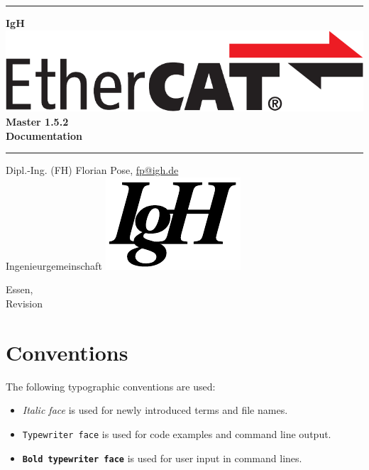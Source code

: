 \documentclass[a4paper,12pt,BCOR6mm,bibtotoc,idxtotoc]{scrbook}
\makeatletter
\renewcommand*{\lstlistoflistings}{%
  \begingroup
    \if@twocolumn
      \@restonecoltrue\onecolumn
    \else
      \@restonecolfalse
    \fi
    \lol@heading
    \setlength{\parskip}{\z@}%
    \setlength{\parindent}{\z@}%
    \setlength{\parfillskip}{\z@ \@plus 1fil}%
    \@starttoc{lol}%
    \if@restonecol\twocolumn\fi
  \endgroup
}
\newcommand{\IgH}{\raisebox{-0.7667ex}
  {\includegraphics[height=2.2ex]{images/ighsign}}}
\newcommand{\masterversion}{1.5.2}
\makeatother
\begin{document}
\pagestyle{empty}

\begin{titlepage}
  \begin{center}
    \rule{\textwidth}{1.5mm}

    {\Huge\sf\textbf{IgH \includegraphics[height=2.4ex]{images/ethercat}
      Master \masterversion}\\[1ex]
      \textbf{Documentation}}

    \vspace{1ex}
    \rule{\textwidth}{1.5mm}

    \vspace{\fill} {\Large Dipl.-Ing. (FH) Florian Pose,
    \url{fp@igh.de}\\[1ex] Ingenieurgemeinschaft \IgH}

    \vspace{\fill}
    {\Large Essen, \rcsInfoLongDate\\[1ex]
      Revision \rcsInfoRevision}
  \end{center}
\end{titlepage}


\pagestyle{scrplain}

\tableofcontents
\listoftables
\listoffigures


\newpage
\pagestyle{scrheadings}

\section*{Conventions}

The following typographic conventions are used:

\begin{itemize}

\item \textit{Italic face} is used for newly introduced terms and file names.

\item \texttt{Typewriter face} is used for code examples and command line
output.

\item \texttt{\textbf{Bold typewriter face}} is used for user input in command
lines.

\end{itemize}
\end{document}
